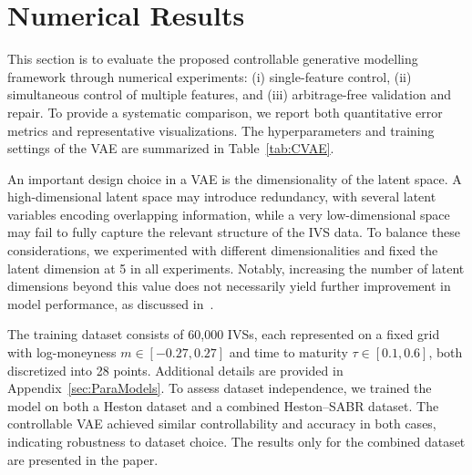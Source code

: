 \documentclass{article}
\begin{document}
\section{Numerical Results}\label{sec:Numerical}



This section is to evaluate  the proposed controllable generative modelling framework through  numerical experiments: (i) single-feature control, (ii) simultaneous control of multiple features, and (iii) arbitrage-free validation and repair. To provide a systematic comparison, we report both quantitative error metrics and representative visualizations.  The hyperparameters and training settings of the VAE are summarized in Table~\ref{tab:CVAE}.

An important design choice in a VAE is the dimensionality of the latent space. A high-dimensional latent space may introduce redundancy, with several latent variables encoding overlapping information, while a very low-dimensional space may fail to fully capture the relevant structure of the IVS data. To balance these considerations, we experimented with different dimensionalities and fixed the latent dimension at 5 in all experiments. Notably, increasing the number of latent dimensions beyond this value does not necessarily yield further improvement in model performance, as discussed in~\citep{ning2023arbitrage}.

 
The training dataset consists of 60,000 IVSs, each represented on a fixed grid with log-moneyness $m \in [-0.27, 0.27]$ and time to maturity $\tau \in [0.1, 0.6]$, both discretized into 28 points. Additional details are provided in Appendix~\ref{sec:ParaModels}. To assess dataset independence, we trained the model on both a Heston dataset and a combined Heston–SABR dataset. The controllable VAE achieved similar controllability and accuracy in both cases, indicating robustness to dataset choice. The results only for the combined dataset are presented in the paper.
\end{document}
